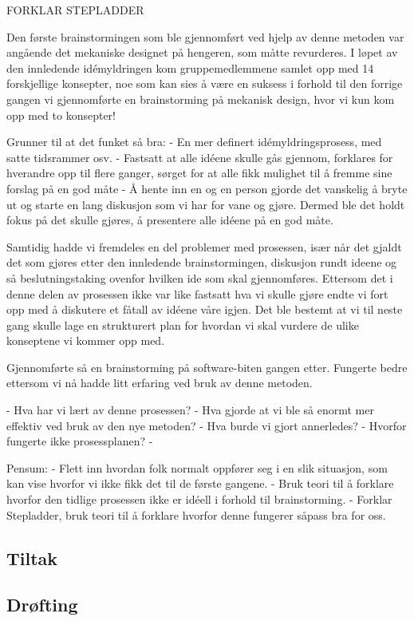 FORKLAR STEPLADDER \newline

Den første brainstormingen som ble gjennomført ved hjelp av denne metoden var angående det mekaniske designet på hengeren, som måtte revurderes. I løpet av den innledende idémyldringen kom gruppemedlemmene samlet opp med 14 forskjellige konsepter, noe som kan sies å være en suksess i forhold til den forrige gangen vi gjennomførte en brainstorming på mekanisk design, hvor vi kun kom opp med to konsepter! \newline

Grunner til at det funket så bra:
	- En mer definert idémyldringsprosess, med satte tidsrammer osv.
	- Fastsatt at alle idéene skulle gås gjennom, forklares for hverandre opp til flere ganger, sørget for at alle fikk mulighet til å fremme 	sine forslag på en god måte
	- Å hente inn en og en person gjorde det vanskelig å bryte ut og starte en lang diskusjon som vi har for vane og gjøre. Dermed ble det holdt fokus på det skulle gjøres, å  presentere alle idéene på en god måte. \newline

Samtidig hadde vi fremdeles en del problemer med prosessen, især når det gjaldt det som gjøres etter den innledende brainstormingen, diskusjon rundt ideene og så beslutningstaking ovenfor hvilken ide som skal gjennomføres. Ettersom det i denne delen av prosessen ikke var like fastsatt hva vi skulle gjøre endte vi fort opp med å diskutere et fåtall av idéene våre igjen. Det ble bestemt at vi til neste gang skulle lage en strukturert plan for hvordan vi skal vurdere de ulike konseptene vi kommer opp med. \newline

Gjennomførte så en brainstorming på software-biten gangen etter. Fungerte bedre ettersom vi nå hadde litt erfaring ved bruk av denne metoden. \newline

- Hva har vi lært av denne prosessen?
- Hva gjorde at vi ble så enormt mer effektiv ved bruk av den nye metoden?
- Hva burde vi gjort annerledes?
- Hvorfor fungerte ikke prosessplanen? \newline
- 

Pensum:
	- Flett inn hvordan folk normalt oppfører seg i en slik situasjon, som kan vise hvorfor vi  ikke fikk det til de første gangene.
	- Bruk teori til å forklare hvorfor den tidlige prosessen ikke er idéell i forhold til  brainstorming.
	- Forklar Stepladder, bruk teori til å forklare hvorfor denne fungerer såpass bra for oss.

\subsection{Tiltak}

\subsection{Drøfting}

